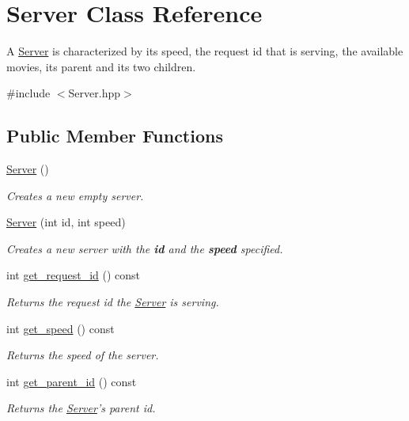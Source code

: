 \hypertarget{class_server}{\section{Server Class Reference}
\label{dc/db6/class_server}
}


A \hyperlink{class_server}{Server} is characterized by its speed, the request id that is serving, the available movies, its parent and its two children.  




{\ttfamily \#include $<$Server.\-hpp$>$}

\subsection*{Public Member Functions}
\begin{DoxyCompactItemize}
\item 
\hyperlink{class_server_ad5ec9462b520e59f7ea831e157ee5e59}{Server} ()
\begin{DoxyCompactList}\small\item\em Creates a new empty server. \end{DoxyCompactList}\item 
\hyperlink{class_server_a066a75893cc4691e6bfa997a0710b354}{Server} (int id, int speed)
\begin{DoxyCompactList}\small\item\em Creates a new server with the {\bfseries id} and the {\bfseries speed} specified. \end{DoxyCompactList}\item 
int \hyperlink{class_server_aa464e17f9008aaee5dfc559d0828703a}{get\-\_\-request\-\_\-id} () const 
\begin{DoxyCompactList}\small\item\em Returns the request id the \hyperlink{class_server}{Server} is serving. \end{DoxyCompactList}\item 
int \hyperlink{class_server_a05d6f00d5bef65c071870153ae74115a}{get\-\_\-speed} () const 
\begin{DoxyCompactList}\small\item\em Returns the speed of the server. \end{DoxyCompactList}\item 
int \hyperlink{class_server_a86797118fa0842e735e5aaaccf030d37}{get\-\_\-parent\-\_\-id} () const 
\begin{DoxyCompactList}\small\item\em Returns the \hyperlink{class_server}{Server}'s parent id. \end{DoxyCompactList}\item 

\end{DoxyCompactItemize}
